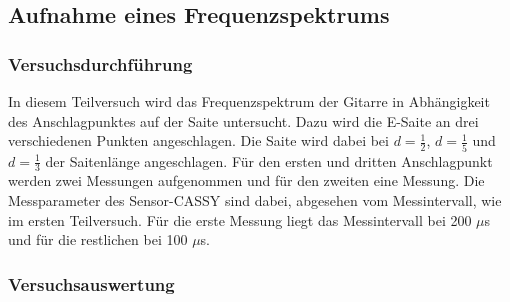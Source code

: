 \subsection{Aufnahme eines Frequenzspektrums}

\subsubsection{Versuchsdurchführung}

In diesem Teilversuch wird das Frequenzspektrum der Gitarre in Abhängigkeit des Anschlagpunktes auf der Saite untersucht. Dazu wird die E-Saite an drei verschiedenen Punkten angeschlagen. Die Saite wird dabei bei $d=\frac 12$, $d=\frac 15$ und $d= \frac 13$ der Saitenlänge angeschlagen. Für den ersten und dritten Anschlagpunkt werden zwei Messungen aufgenommen und für den zweiten eine Messung. Die Messparameter des Sensor-CASSY sind dabei, abgesehen vom Messintervall, wie im ersten Teilversuch. Für die erste Messung liegt das Messintervall bei 200 $\mu$s und für die restlichen bei 100 $\mu$s.


\subsubsection{Versuchsauswertung}

